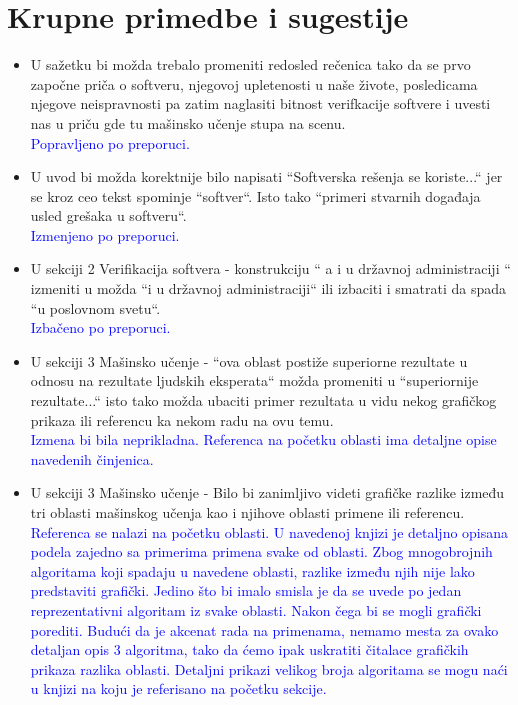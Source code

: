 \documentclass[a4paper]{report}
\newcommand{\odgovor}[1]{\textcolor{blue}{#1}}
\begin{document}
\section{Krupne primedbe i sugestije}
\begin{itemize}
  \item U sažetku bi možda trebalo promeniti redosled rečenica tako da se prvo započne priča o softveru, njegovoj upletenosti u naše živote, posledicama njegove neispravnosti pa zatim naglasiti bitnost verifkacije softvere i uvesti nas u priču gde tu mašinsko učenje stupa na scenu.
  \\\odgovor{Popravljeno po preporuci.}
  
  \item U uvod bi možda korektnije bilo napisati ``Softverska rešenja se koriste...`` jer se kroz ceo tekst spominje ``softver``. Isto tako ``primeri stvarnih događaja usled grešaka u softveru``.
  \\\odgovor{Izmenjeno po preporuci.}
  
  \item U sekciji 2 Verifikacija softvera - konstrukciju `` a i u državnoj administraciji `` izmeniti u možda ``i u državnoj administraciji`` ili izbaciti i smatrati da spada ``u poslovnom svetu``.
  \\\odgovor{Izbačeno po preporuci.}
  
  \item U sekciji 3 Mašinsko učenje - ``ova oblast postiže superiorne rezultate  u odnosu na rezultate ljudskih eksperata`` možda promeniti u ``superiornije rezultate...`` isto tako možda ubaciti primer rezultata u vidu nekog grafičkog prikaza ili referencu ka nekom radu na ovu temu.
  \\\odgovor{Izmena bi bila neprikladna. Referenca na početku oblasti ima detaljne opise navedenih činjenica.}
  
  \item U sekciji 3 Mašinsko učenje - Bilo bi zanimljivo videti grafičke razlike između tri oblasti mašinskog učenja kao i njihove oblasti primene ili referencu.
  \\\odgovor{Referenca se nalazi na početku oblasti. U navedenoj knjizi je detaljno opisana podela zajedno sa primerima primena svake od oblasti. Zbog mnogobrojnih algoritama koji spadaju u navedene oblasti, razlike između njih nije lako predstaviti grafički. Jedino što bi imalo smisla je da se uvede po jedan reprezentativni algoritam iz svake oblasti. Nakon čega bi se mogli grafički porediti. Budući da je akcenat rada na primenama, nemamo mesta za ovako detaljan opis 3 algoritma, tako da ćemo ipak uskratiti čitalace grafičkih prikaza razlika oblasti. Detaljni prikazi velikog broja algoritama se mogu naći u knjizi na koju je referisano na početku sekcije. }
  

\end{itemize}
\end{document}
